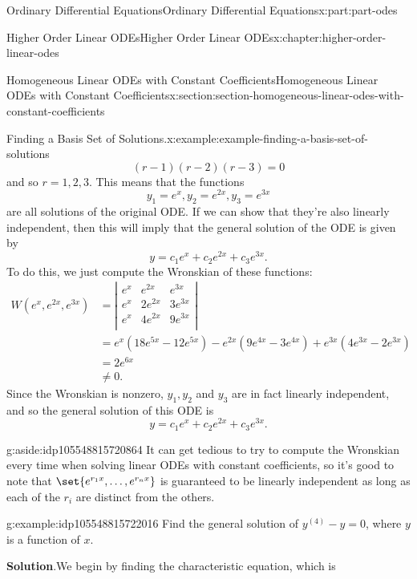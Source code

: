 \documentclass[twoside,10pt,]{book}
\newcommand{\blocktitlefont}{\relax}
\numberwithin{equation}{part}
\newcommand{\amp}{&}
\begin{document}
\begin{partptx}{Ordinary Differential Equations}{}{Ordinary Differential Equations}{}{}{x:part:part-odes}
\begin{chapterptx}{Higher Order Linear ODEs}{}{Higher Order Linear ODEs}{}{}{x:chapter:higher-order-linear-odes}
\begin{sectionptx}{Homogeneous Linear ODEs with Constant Coefficients}{}{Homogeneous Linear ODEs with Constant Coefficients}{}{}{x:section:section-homogeneous-linear-odes-with-constant-coefficients}
\begin{example}{Finding a Basis Set of Solutions.}{x:example:example-finding-a-basis-set-of-solutions}
\begin{equation*}
(r-1)(r-2)(r-3)=0
\end{equation*}
and so \(r=1,2,3.\) This means that the functions%
\begin{equation*}
y_{1} = e^{x},y_{2} = e^{2x},y_{3} = e^{3x}
\end{equation*}
are all solutions of the original ODE. If we can show that they're also linearly independent, then this will imply that the general solution of the ODE is given by%
\begin{equation*}
y = c_{1}e^{x}+c_{2}e^{2x}+c_{3}e^{3x}.
\end{equation*}
To do this, we just compute the Wronskian of these functions:%
%
\begin{align*}
W(e^{x},e^{2x},e^{3x})
\amp= \left|
\begin{array}{ccc}
e^{x} \amp e^{2x}  \amp e^{3x}  \\
e^{x} \amp 2e^{2x} \amp 3e^{3x} \\
e^{x} \amp 4e^{2x} \amp 9e^{3x} \\
\end{array}
\right|\\
\amp= e^{x}(18e^{5x}-12e^{5x})-e^{2x}(9e^{4x}-3e^{4x})+e^{3x}(4e^{3x}-2e^{3x})\\
\amp= 2e^{6x}\\
\amp\neq0.
\end{align*}
Since the Wronskian is nonzero, \(y_{1},y_{2}\) and \(y_{3}\) are in fact linearly independent, and so the general solution of this ODE is%
\begin{equation*}
y = c_{1}e^{x}+c_{2}e^{2x}+c_{3}e^{3x}.
\end{equation*}
%
\end{example}
\begin{aside}{}{g:aside:idp105548815720864}%
It can get tedious to try to compute the Wronskian every time when solving linear ODEs with constant coefficients, so it's good to note that \(\set{e^{r_{1}x},\dots,e^{r_{n}x}}\) is guaranteed to be linearly independent as long as each of the \(r_{i}\) are distinct from the others.%
\end{aside}
\begin{example}{}{g:example:idp105548815722016}%
Find the general solution of \(y^{(4)}-y=0\), where \(y\) is a function of \(x\).%
\par\smallskip%
\noindent\textbf{\blocktitlefont Solution}.\hypertarget{g:solution:idp105548815723680}{}\quad{}We begin by finding the characteristic equation, which is%
\begin{equation*}

\end{equation*}
\end{example}
\end{sectionptx}
\end{chapterptx}
\end{partptx}
\end{document}
